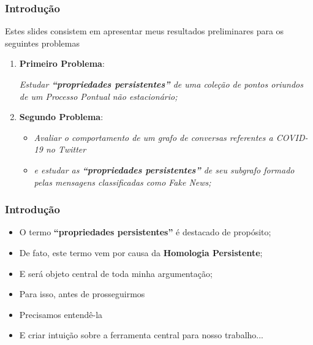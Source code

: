 \documentclass[11pt]{beamer}
\begin{document}

    \begin{frame}
        \frametitle{Introdução}

        Estes slides consistem em apresentar meus resultados
        preliminares para os seguintes problemas

        \begin{enumerate}
            \item \textbf{Primeiro Problema}:
            \begin{center}
                    \emph{
                        Estudar \textbf{``propriedades persistentes''} de uma
                        coleção de pontos oriundos de um Processo
                        Pontual não estacionário;
                    }
            \end{center}

        \item \textbf{Segundo Problema}:
            \begin{center}
                \begin{itemize}
                    \item
                        \emph{
                            Avaliar o comportamento de um grafo de conversas
                            referentes a COVID-19 no Twitter
                        }
                    \item
                        \emph{ e estudar as
                            \textbf{``propriedades persistentes''} de seu subgrafo formado
                            pelas mensagens classificadas como Fake News;
                        }
                \end{itemize}
            \end{center}
        \end{enumerate}
    \end{frame}

    \begin{frame}
        \frametitle{Introdução}
        \begin{itemize}
            \item
                O termo \textbf{``propriedades persistentes''} 
                é destacado de propósito;

            \item 
                De fato, este termo vem por causa da \textbf{Homologia
                Persistente};

            \item 
                E será objeto central de toda minha argumentação;

            \item Para isso, antes de prosseguirmos 

            \item Precisamos entendê-la

            \item E criar intuição sobre a ferramenta central para nosso
                trabalho...
        \end{itemize}
    \end{frame}
\end{document}

